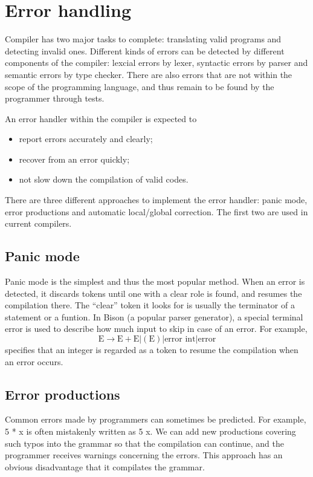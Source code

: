 \section{Error handling}
Compiler has two major tasks to complete: translating valid programs and detecting invalid ones. Different kinds of errors can be detected by different components of the compiler: lexcial errors by lexer, syntactic errors by parser and semantic errors by type checker. There are also errors that are not within the scope of the programming language, and thus remain to be found by the programmer through tests.

An error handler within the compiler is expected to 
\begin{itemize}
\item report errors accurately and clearly;
\item recover from an error quickly;
\item not slow down the compilation of valid codes.
\end{itemize}
There are three different approaches to implement the error handler: panic mode, error productions and automatic local/global correction. The first two are used in current compilers.

\subsection{Panic mode}
Panic mode is the simplest and thus the most popular method. When an error is detected, it discards tokens until one with a clear role is found, and resumes the compilation there. The ``clear'' token it looks for is usually the terminator of a statement or a funtion. In Bison (a popular parser generator), a special terminal {\sf error} is used to describe how much input to skip in case of an error. For example,
\begin{equation*}
\text{E}\rightarrow \text{E} + \text{E} | (\text{E}) | \text{error int}|\text{error}
\end{equation*}
specifies that an integer is regarded as a token to resume the compilation when an error occurs.
\subsection{Error productions}
Common errors made by programmers can sometimes be predicted. For example, 5 * x is often mistakenly written as 5 x. We can add new productions covering such typos into the grammar so that the compilation can continue, and the programmer receives warnings concerning the errors. This approach has an obvious disadvantage that it compilates the grammar.
